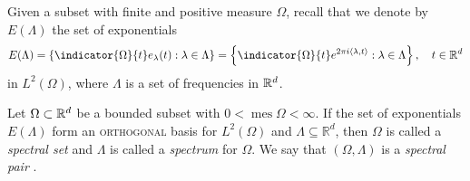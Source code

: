 \documentclass[../thesis.tex]{subfiles}
\begin{document}






Given a subset with finite and positive measure $\Omega$, recall that we denote by $E(\Lambda)$ the set of exponentials
\begin{align}\label{eq:exp_set_all_d}
    E(\Lambda) = \braqMed{\indicator{\Omega}{t} e_\lambda(t) : \lambda \in \Lambda} = \braqMed{\indicator{\Omega}{t} e^{2 \pi i \inpl{t}} : \lambda \in \Lambda}, \quad t\in \R^d%
\end{align}
in $L^2(\Omega)$, where $\Lambda$ is a set of frequencies in $\mathbb{R}^d$.
\begin{definition} \label{def:spectral_set} 
    Let $\Omega \subset \mathbb{R}^d$ be a bounded subset with $0< \operatorname{mes} \Omega < \infty$. If the set of exponentials $E(\Lambda)$ form an \textsc{orthogonal} basis for $L^2 (\Omega)$ and $\Lambda \subseteq \mathbb{R}^d$, then $\Omega$ is called a \emph{spectral set} and $\Lambda$ is called a \emph{spectrum} for $\Omega$. We say that $(\Omega, \Lambda)$ is a \emph{spectral pair} \cite{liuUniformityNonUniformGabor2003}.
\end{definition} 
\end{document}

